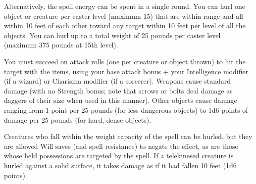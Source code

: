 {	Alternatively, the spell energy can be spent in a single round. You can hurl one object or creature per caster level (maximum 15) that are within range and all within 10 feet of each other toward any target within 10 feet per level of all the objects. You can hurl up to a total weight of 25 pounds per caster level (maximum 375 pounds at 15th level).


	You must succeed on attack rolls (one per creature or object thrown) to hit the target with the items, using your base attack bonus + your Intelligence modifier (if a wizard) or Charisma modifier (if a sorcerer). Weapons cause standard damage (with no Strength bonus; note that arrows or bolts deal damage as daggers of their size when used in this manner). Other objects cause damage ranging from 1 point per 25 pounds (for less dangerous objects) to 1d6 points of damage per 25 pounds (for hard, dense objects).


	Creatures who fall within the weight capacity of the spell can be hurled, but they are allowed Will saves (and spell resistance) to negate the effect, as are those whose held possessions are targeted by the spell. If a telekinesed creature is hurled against a solid surface, it takes damage as if it had fallen 10 feet (1d6 points).
}
        
